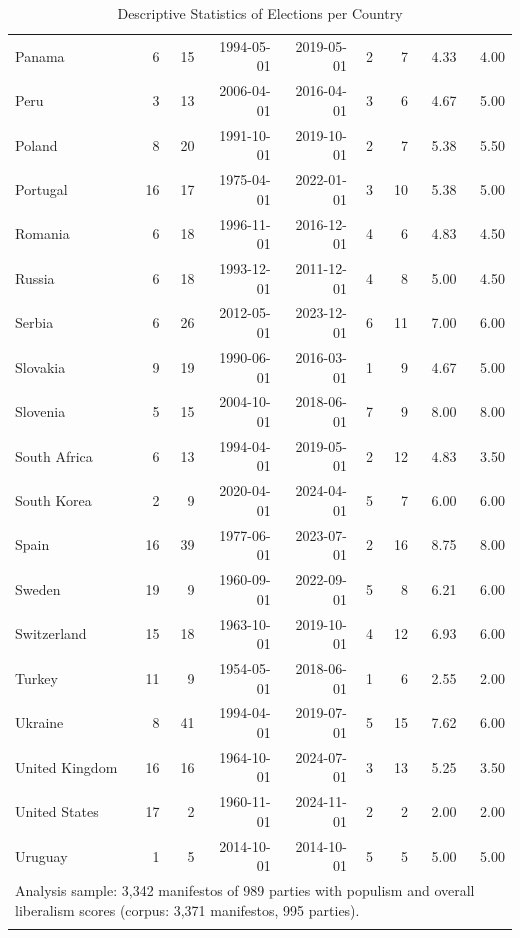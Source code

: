 {\begin{longtable}{lrrrrrrrr}
Panama & 6 & 15 & 1994-05-01 & 2019-05-01 & 2 & 7 & 4.33 & 4.00 \\
Peru & 3 & 13 & 2006-04-01 & 2016-04-01 & 3 & 6 & 4.67 & 5.00 \\
Poland & 8 & 20 & 1991-10-01 & 2019-10-01 & 2 & 7 & 5.38 & 5.50 \\
Portugal & 16 & 17 & 1975-04-01 & 2022-01-01 & 3 & 10 & 5.38 & 5.00 \\
Romania & 6 & 18 & 1996-11-01 & 2016-12-01 & 4 & 6 & 4.83 & 4.50 \\
Russia & 6 & 18 & 1993-12-01 & 2011-12-01 & 4 & 8 & 5.00 & 4.50 \\
Serbia & 6 & 26 & 2012-05-01 & 2023-12-01 & 6 & 11 & 7.00 & 6.00 \\
Slovakia & 9 & 19 & 1990-06-01 & 2016-03-01 & 1 & 9 & 4.67 & 5.00 \\
Slovenia & 5 & 15 & 2004-10-01 & 2018-06-01 & 7 & 9 & 8.00 & 8.00 \\
South Africa & 6 & 13 & 1994-04-01 & 2019-05-01 & 2 & 12 & 4.83 & 3.50 \\
South Korea & 2 & 9 & 2020-04-01 & 2024-04-01 & 5 & 7 & 6.00 & 6.00 \\
Spain & 16 & 39 & 1977-06-01 & 2023-07-01 & 2 & 16 & 8.75 & 8.00 \\
Sweden & 19 & 9 & 1960-09-01 & 2022-09-01 & 5 & 8 & 6.21 & 6.00 \\
Switzerland & 15 & 18 & 1963-10-01 & 2019-10-01 & 4 & 12 & 6.93 & 6.00 \\
Turkey & 11 & 9 & 1954-05-01 & 2018-06-01 & 1 & 6 & 2.55 & 2.00 \\
Ukraine & 8 & 41 & 1994-04-01 & 2019-07-01 & 5 & 15 & 7.62 & 6.00 \\
United Kingdom & 16 & 16 & 1964-10-01 & 2024-07-01 & 3 & 13 & 5.25 & 3.50 \\
United States & 17 & 2 & 1960-11-01 & 2024-11-01 & 2 & 2 & 2.00 & 2.00 \\
Uruguay & 1 & 5 & 2014-10-01 & 2014-10-01 & 5 & 5 & 5.00 & 5.00 \\
   \bottomrule
\multicolumn{9}{p{0.9\linewidth}}{\scriptsize Analysis sample: 3,342 manifestos of 989 parties with populism and overall liberalism scores (corpus: 3,371 manifestos, 995 parties).} \\
\caption{Descriptive Statistics of Elections per Country}
\label{tab:stat1}
\end{longtable}
}
